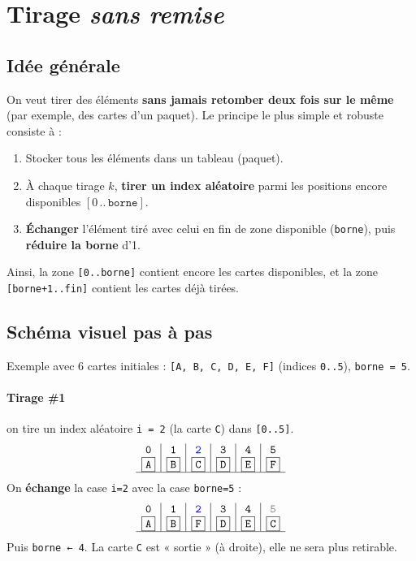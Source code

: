 \section{Tirage \emph{sans remise}}
\label{sec:tirage-sans-remise}

\subsection*{Idée générale}
On veut tirer des éléments \textbf{sans jamais retomber deux fois sur le même} (par exemple, des cartes d’un paquet).  
Le principe le plus simple et robuste consiste à :
\begin{enumerate}
  \item Stocker tous les éléments dans un tableau (paquet).
  \item À chaque tirage $k$, \textbf{tirer un index aléatoire} parmi les positions encore disponibles $[0\,..\,\texttt{borne}]$.
  \item \textbf{Échanger} l’élément tiré avec celui en fin de zone disponible (\texttt{borne}), puis \textbf{réduire la borne} d’1.
\end{enumerate}
Ainsi, la zone \texttt{[0..borne]} contient encore les cartes disponibles, et la zone \texttt{[borne+1..fin]} contient les cartes déjà tirées.

\subsection*{Schéma visuel pas à pas}
Exemple avec 6 cartes initiales : \texttt{[A, B, C, D, E, F]} (indices \texttt{0..5}), \texttt{borne = 5}.

\paragraph{Tirage \#1} on tire un index aléatoire \texttt{i = 2} (la carte \texttt{C}) dans \texttt{[0..5]}.
\[
\begin{array}{c|c|c|c|c|c}
\texttt{0} & \texttt{1} & \color{blue}{\texttt{2}} & \texttt{3} & \texttt{4} & \texttt{5}\\
\boxed{\texttt{A}} & \boxed{\texttt{B}} & \boxed{\texttt{C}} & \boxed{\texttt{D}} & \boxed{\texttt{E}} & \boxed{\texttt{F}} \\
\hline
\end{array}
\]
On \textbf{échange} la case \texttt{i=2} avec la case \texttt{borne=5} :
\[
\begin{array}{c|c|c|c|c|c}
\texttt{0} & \texttt{1} & \color{blue}{\texttt{2}} & \texttt{3} & \texttt{4} & \color{gray}{\texttt{5}}\\
\boxed{\texttt{A}} & \boxed{\texttt{B}} & \boxed{\texttt{F}} & \boxed{\texttt{D}} & \boxed{\texttt{E}} & \fbox{\texttt{C}} \\
\hline
\end{array}
\]
Puis \texttt{borne ← 4}. La carte \texttt{C} est « sortie » (à droite), elle ne sera plus retirable.

